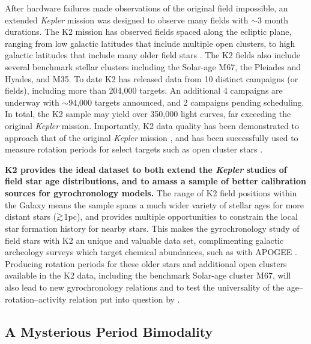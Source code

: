 \documentclass[12pt]{article}
\newcommand{\Kepler}{\textsl{Kepler}\xspace}
\def\gtrsim{\mathrel{\hbox{\rlap{\hbox{\lower3pt\hbox{$\sim$}}}\hbox{\raise2pt\hbox{$>$}}}}}
\begin{document}
After hardware failures made observations of the original field impossible, an extended \Kepler mission was designed to observe many fields with $\sim$3 month durations. The K2 mission has observed fields spaced along the ecliptic plane, ranging from low galactic latitudes that include multiple open clusters, to high galactic latitudes that include many older field stars \citep{howell2014}. The K2 fields also include several benchmark stellar clusters including the Solar-age M67, the Pleiades and Hyades, and M35. To date K2 has released data from 10 distinct campaigns (or fields), including more than 204,000 targets. An additional 4 campaigns are underway with $\sim$94,000 targets announced, and 2 campaigns pending scheduling. In total, the K2 sample may yield over 350,000 light curves, far exceeding the original \Kepler mission. Importantly, K2 data quality has been demonstrated to approach that of the original \Kepler mission \citep{luger2016}, and has been successfully used to measure rotation periods for select targets such as open cluster stars \citep[e.g.][]{douglas2017}.


{\bf K2 provides the ideal dataset to both extend the \Kepler studies of field
star age distributions, and to amass a sample of better calibration sources
for gyrochronology models.} The range of K2 field positions within the Galaxy
means the sample spans a much wider variety of stellar ages for more distant
stars ($\gtrsim$1pc), and provides multiple opportunities to constrain the
local star formation history for nearby stars. This makes the gyrochronology
study of field stars with K2 an unique and valuable data set, complimenting
galactic archeology surveys which target chemical abundances, such as with
APOGEE \citep{hayden2014}.
Producing rotation periods for these older stars and additional open clusters available in the K2 data, including the benchmark Solar-age cluster M67, will also lead to new gyrochronology relations and to test the universality of the age--rotation--activity relation put into question by \citet{angus2015}.



\subsection{A Mysterious Period Bimodality}
\end{document}

